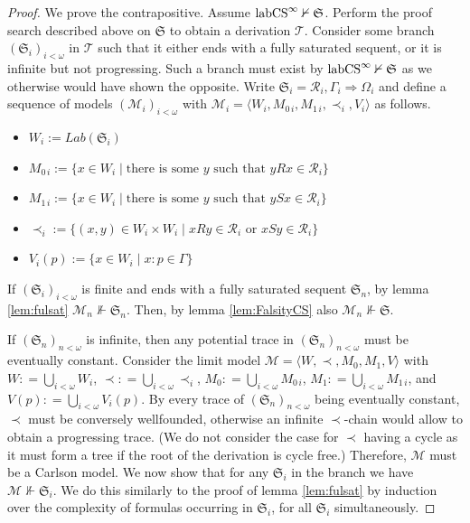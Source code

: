 \documentclass[runningheads,orivec]{llncs}
\newcommand{\labCS}{{\textnormal{labCS}^\infty}}
\newcommand{\Ra}{\Rightarrow}
\newcommand{\la}{\langle}
\newcommand{\ra}{\rangle}
\newcommand{\spa}{\;|\;}
\newcommand{\R}{\mathcal{R}}
\newcommand{\Mw}{\mathcal{M}}
\newcommand{\Seq}{\mathfrak{S}}
\newcommand{\tree}{\mathcal{T}}
\begin{document}
\begin{proof}    
    We prove the contrapositive.
    Assume $\labCS \nvdash \Seq$. Perform the proof search described above on $\Seq$ to obtain a derivation $\tree$. Consider some branch $(\Seq_i)_{i < \omega}$ in $\tree$ such that it either ends with a fully saturated sequent, or it is infinite but not progressing. Such a branch must exist by $\labCS \nvdash \Seq$ as we otherwise would have shown the opposite. 
    Write $\Seq_i = \R_i , \Gamma_i \Ra \Omega_i$ and define a sequence of models $(\Mw_i)_{i < \omega}$ with $\Mw_i = \la W_i , M_{0 \, i}, M_{1 \, i}, \prec_i, V_i \ra$ as follows.
    \begin{itemize}
        \item[] $W_i := Lab(\Seq_i)$
        \item[] $M_{0 \, i} := \{ x \in W_i \spa \text{there is some } y \text{ such that } yRx \in \R_i \}$
        \item[] $M_{1 \, i}:= \{ x \in W_i \spa \text{there is some } y \text{ such that } ySx \in \R_i \}$
        \item[] ${\prec_i} := \{ (x,y) \in W_i \times W_i \spa xRy \in \R_i \text{ or } xSy \in \R_i \}$
        \item[] $V_i(p) := \{ x \in W_i \spa x : p \in \Gamma \}$
    \end{itemize}
    
    If $(\Seq_i)_{i < \omega}$ is finite and ends with a fully saturated sequent $\Seq_n$, by lemma \ref{lem:fulsat} $\Mw_n \nVdash \Seq_n$. Then, by lemma \ref{lem:FalsityCS} also $\Mw_n \nVdash \Seq$.
    
    If $(\Seq_n)_{n < \omega}$ is infinite, then any potential trace in $(\Seq_n)_{n < \omega}$ must be eventually constant. Consider the limit model $\Mw = \la W , \prec , M_0 , M_1 , V \ra$ with $W : =\bigcup_{i < \omega} W_i$, ${\prec} : =\bigcup_{i < \omega} \prec_i$, $M_0 : =\bigcup_{i < \omega} M_{0 \, i}$, $M_1 : =\bigcup_{i < \omega} M_{1 \, i}$, and $V(p) : =\bigcup_{i < \omega} V_i (p)$. 
    By every trace of $(\Seq_n)_{n < \omega}$ being eventually constant, $\prec$ must be conversely wellfounded, otherwise an infinite $\prec$-chain would allow to obtain a progressing trace. (We do not consider the case for $\prec$ having a cycle as it must form a tree if the root of the derivation is cycle free.) Therefore, $\Mw$ must be a Carlson model. We now show that for any $\Seq_i$ in the branch we have $\Mw \nVdash \Seq_i$. We do this similarly to the proof of lemma \ref{lem:fulsat} by induction over the complexity of formulas occurring in $\Seq_i$, for all $\Seq_i$ simultaneously. 
    

\end{proof}
\end{document}
